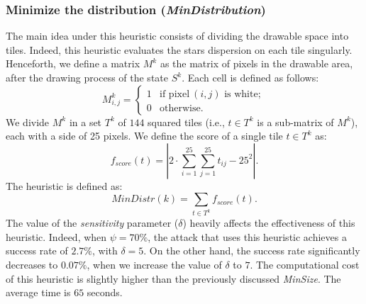 \documentclass[conference]{IEEEtran}
\begin{document}
\subsubsection{Minimize the distribution (\textit{MinDistribution})}
The main idea under this heuristic consists of dividing the drawable space into tiles.
Indeed, this heuristic evaluates the stars dispersion on each tile singularly. Henceforth, we define a matrix $M^k$ as the matrix of pixels in the drawable area, after the drawing process of the state $S^k$.
Each cell is defined as follows:
$$
M^k_{i,j}=
 \begin{cases}
      1 & \text{if pixel}\ (i,j) \text{ is white;}\  \\
      0 & \text{otherwise.}
    \end{cases} 
$$
We divide $M^k$ in a set $T^k$ of $144$ squared tiles (i.e., $t \in T^k$ is a sub-matrix of $M^k$), each with a side of 25 pixels.
We define the score of a single tile $t \in T^k$ as:
$$ f_{score}(t)=|2\cdot \sum_{i=1}^{25} \sum_{j=1}^{25} t_{ij}-25^2| .$$ The heuristic is defined as:
$$ {MinDistr}(k)= \sum_{t\in T^k} f_{score}(t) .$$
The value of the \textit{sensitivity} parameter ($\delta$) heavily affects the effectiveness of this heuristic.
Indeed, when $\psi=70\%$, the attack that uses this heuristic achieves a success rate of $2.7\%$, with $\delta=5$.
On the other hand, the success rate significantly decreases to $0.07\%$, when we increase the value of $\delta$ to $7$. The computational cost of this heuristic is slightly higher than the previously discussed \textit{MinSize}.
The average time is $65$ seconds. 


\begin{comment}
\subsection{Maximize the number of drawn stars (\textit{MaxDrawn})}
During the drawing process, some stars can be placed outside the drawable area.
Not surprisingly, a state that represents a valid solution has a high probability of having a lower number of pixels outside the drawable area than invalid states.
This happens with a $100\%$ probability with $\psi=0\%$, and decrease as $\psi$ rise.
We define with $\bar{M}$ the set of pixels outside the drawable area.
We search the states with the lowest $|\bar{M}|$, and then apply the previously defined ${MinDistr}$.
In Figure~\ref{fig:allattacksONsens}, we compare the success rate of the heuristics on the variation of \textit{sensitivity} ($\delta$).
Increase $\delta$ raise the success rate of MaxDrawn, but drops down the effectiveness of MinDistribution.
The execution time of this strategy is average $67$ seconds.
This is not far from the cost of MinDistribution, since the count of pixels off-screen is a very cheap task.
\end{comment}
\end{document}

